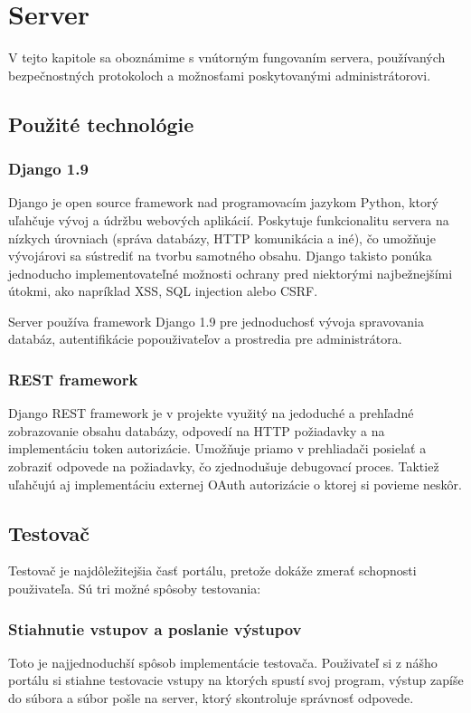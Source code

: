 \chapter{Server}

\label{kap:server}

V tejto kapitole sa oboznámime s vnútorným fungovaním servera, používaných bezpečnostných protokoloch
a možnosťami poskytovanými administrátorovi.

\section{Použité technológie}

\subsection{Django 1.9}
Django je open source framework nad programovacím jazykom Python, ktorý uľahčuje vývoj a údržbu webových aplikácií.
Poskytuje funkcionalitu servera na nízkych úrovniach (správa databázy, HTTP komunikácia a iné), čo umožňuje vývojárovi sa sústrediť na tvorbu samotného obsahu.
Django takisto ponúka jednoducho implementovateľné možnosti ochrany pred niektorými najbežnejšími útokmi, ako napríklad XSS, SQL injection alebo CSRF.

Server používa framework Django 1.9 pre jednoduchosť vývoja spravovania databáz, autentifikácie popouživateľov a prostredia pre administrátora.
\subsection{REST framework}
Django REST framework je v projekte využitý na jedoduché a prehľadné zobrazovanie obsahu databázy, odpovedí na HTTP požiadavky a na implementáciu
token autorizácie. Umožňuje priamo v prehliadači posielať a zobraziť odpovede na požiadavky, čo zjednodušuje debugovací proces. Taktiež uľahčujú aj implementáciu externej OAuth
autorizácie o ktorej si povieme neskôr.
\newpage
\section{Testovač}
Testovač je najdôležitejšia časť portálu, pretože dokáže zmerať schopnosti použivateľa. Sú tri možné spôsoby testovania:
\subsection{Stiahnutie vstupov a poslanie výstupov}
\label{testovac1}
Toto je najjednoduchší spôsob implementácie testovača. Použivateľ si z nášho portálu si stiahne testovacie vstupy na ktorých spustí
svoj program, výstup zapíše do súbora a súbor pošle na server, ktorý skontroluje správnosť odpovede.


